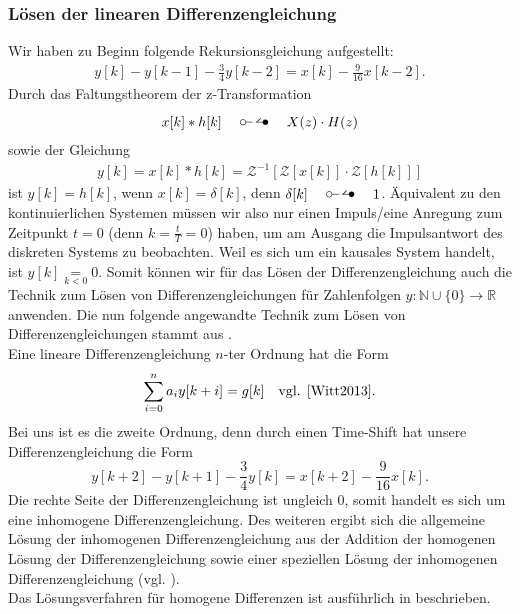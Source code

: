 \documentclass[11pt,a4paper,DIV=12]{scrartcl}
\begin{document}
\subsubsection*{Lösen der linearen Differenzengleichung}
Wir haben zu Beginn folgende Rekursionsgleichung aufgestellt:
%
\begin{gather}
	y[k]-y[k-1]-\frac{3}{4}y[k-2]=x[k]-\frac{9}{16}x[k-2].
\end{gather}
%
Durch das Faltungstheorem der z-Transformation
%
\begin{gather}
	x[k]\ast h[k]\quad\ztransf\quad X(z)\cdot H(z)
\end{gather}
%
sowie der Gleichung
%
\begin{gather}
	y[k]=x[k]\ast h[k]=\mathcal{Z}^{-1}\left[\mathcal{Z}\left[x[k]\right]\cdot\mathcal{Z}\left[h[k]\right]\right]
\end{gather}
%
ist $y[k]=h[k]$, wenn $x[k]=\delta[k]$, denn $\delta[k]\quad\ztransf\quad 1$.
%
Äquivalent zu den kontinuierlichen Systemen müssen wir also nur einen 
Impuls/eine Anregung zum Zeitpunkt $t=0$ (denn $k=\frac{t}{T}=0$) haben, 
um am Ausgang die Impulsantwort des diskreten Systems zu beobachten. 
%
Weil es sich um ein kausales System handelt, ist $y[k]\underset{k<0}{=}0$. 
%
Somit können wir für das Lösen der Differenzengleichung auch die Technik zum 
Lösen von Differenzengleichungen für Zahlenfolgen 
$y:\mathbb{N}\cup\{0\}\rightarrow\mathbb{R}$ anwenden.
%
Die nun folgende angewandte Technik zum Lösen von Differenzengleichungen stammt 
aus \cite[Kap. 5]{Witt2013}.\\
%
Eine lineare Differenzengleichung $n$-ter Ordnung hat die Form
%
\begin{gather}
	\sum_{i=0}^na_iy[k+i]=g[k]\quad \text{vgl. \cite[Kap. 5 S. 80]{Witt2013}}.
\end{gather}
%
Bei uns ist es die zweite Ordnung, denn durch einen Time-Shift hat unsere 
Differenzengleichung die Form 
$$y[k+2]-y[k+1]-\frac{3}{4}y[k]=x[k+2]-\frac{9}{16}x[k].$$
%
Die rechte Seite der Differenzengleichung ist ungleich $0$, 
somit handelt es sich um eine inhomogene Differenzengleichung. 
%
Des weiteren ergibt sich die allgemeine Lösung der inhomogenen 
Differenzengleichung aus der Addition der homogenen Lösung der 
Differenzengleichung sowie einer speziellen Lösung der inhomogenen 
Differenzengleichung (vgl. \cite[Kap. 5 S. 83]{Witt2013}).\\
%
Das Lösungsverfahren für homogene Differenzen ist ausführlich 
in \cite[Kap. 5 S. 84-85]{Witt2013} beschrieben.\\
\end{document}
